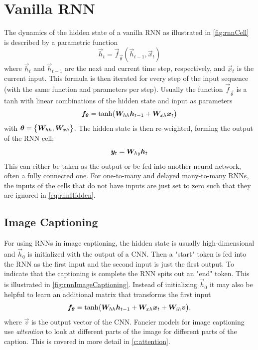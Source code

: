 	\section{Vanilla RNN}
		The dynamics of the hidden state of a vanilla RNN as illustrated in \autoref{fig:rnnCell} is described by a parametric function
		\begin{equation}
			\vec{h}_t = \vec{f}_{\vec{\theta}}(\vec{h}_{t - 1}, \vec{x}_t)
		\end{equation}
		where \( \vec{h}_t \) and \( \vec{h}_{t - 1} \) are the next and current time step, respectively, and \(\vec{x}_t\) is the current input. This formula is then iterated for every step of the input sequence (with the same function and parameters per step). Usually the function \( \vec{f}_{\vec{\theta}} \) is a tanh with linear combinations of the hidden state and input as parameters
		\begin{equation}
			\bm{f}_{\bm{\theta}} = \tanh\!\big( \bm{W}_{hh} \bm{h}_{t - 1} + \bm{W}_{xh} \bm{x}_t \big)  \label{eq:rnnHidden}
		\end{equation}
		with \( \bm{\theta} = \big\{ \bm{W}_{hh}, \bm{W}_{xh} \big\} \). The hidden state is then re-weighted, forming the output of the RNN cell:
		\begin{equation}
			\bm{y}_t = \bm{W}_{hy} \bm{h}_t
		\end{equation}
		This can either be taken as the output or be fed into another neural network, often a fully connected one. For one-to-many and delayed many-to-many RNNs, the inputs of the cells that do not have inputs are just set to zero such that they are ignored in \autoref{eq:rnnHidden}.


		\subsection{Image Captioning}
			For using RNNs in image captioning, the hidden state is usually high-dimensional and \(\vec{h}_0\) is initialized with the output of a CNN. Then a "start" token is fed into the RNN as the first input and the second input is just the first output. To indicate that the captioning is complete the RNN spits out an "end" token. This is illustrated in \autoref{fig:rnnImageCaptioning}. Instead of initializing \(\vec{h}_0\) it may also be helpful to learn an additional matrix that transforms the first input
			\begin{equation}
				\bm{f}_{\bm{\theta}} = \tanh\!\big( \bm{W}_{hh} \bm{h}_{t - 1} + \bm{W}_{xh} \bm{x}_t + \bm{W}_{ih} \bm{v} \big),
			\end{equation}
			where \( \vec{v} \) is the output vector of the CNN. Fancier models for image captioning use \emph{attention} to look at different parts of the image for different parts of the caption. This is covered in more detail in \autoref{c:attention}.

